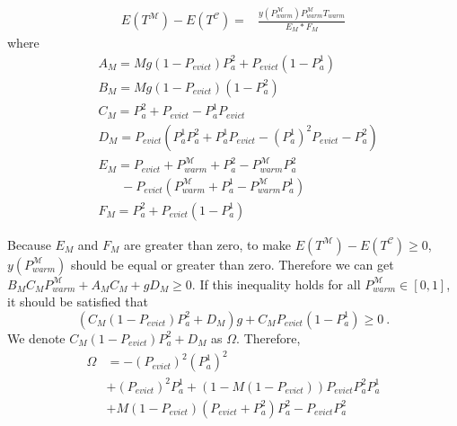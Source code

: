 \begin{equation}
\label{equ:detail2}
\begin{split}
E(T^{\mathcal{M}}) - E(T^{\mathcal{C}}) = &\frac{y(P_{warm}^{\mathcal{M}})P_{warm}^{\mathcal{M}}T_{warm}}{E_{M}*F_{M}}
\end{split}\end{equation}
where
\begin{equation*}
\begin{split}
&A_{M}= Mg(1-P_{evict})P_{a}^{\mathfrak{2}}+P_{evict}(1-P_{a}^{\mathfrak{1}})\\
&B_{M}=Mg(1-P_{evict})(1-P_{a}^{\mathfrak{2}})\\
&C_{M}=P_{a}^{\mathfrak{2}}+P_{evict}-P_{a}^{\mathfrak{1}}P_{evict}\\
&D_{M}=P_{evict}(P_{a}^{\mathfrak{1}}P_{a}^{\mathfrak{2}}+P_{a}^{\mathfrak{1}}P_{evict}-(P_{a}^{\mathfrak{1}})^2P_{evict}-P_{a}^{\mathfrak{2}})\\
&E_{M}=P_{evict}+P_{warm}^{\mathcal{M}}+P_{a}^{\mathfrak{2}}-P_{warm}^{\mathcal{M}}P_{a}^{\mathfrak{2}} \\& \ \ \ \ \ \ \ \ -P_{evict}(P_{warm}^{\mathcal{M}}+P_{a}^{\mathfrak{1}}-P_{warm}^{\mathcal{M}}P_{a}^{\mathfrak{1}})\\
&F_{M}=P_{a}^{\mathfrak{2}}+P_{evict}(1-P_{a}^{\mathfrak{1}})
\end{split}\end{equation*}

Because $E_{M}$ and $F_{M}$ are greater than zero, to make $E(T^{\mathcal{M}}) - E(T^{\mathcal{C}}) \geq 0$, $y(P_{warm}^{\mathcal{M}})$ should be equal or greater than zero.
Therefore we can get $ B_{M}C_{M}P_{warm}^{\mathcal{M}}+A_{M}C_{M}+gD_{M} \geq 0$.
If this inequality holds for all $P_{warm}^{\mathcal{M}} \in [0,1]$, it should be satisfied that
\begin{equation}\label{equ:omega}
  (C_{M}(1-P_{evict})P_{a}^{\mathfrak{2}}+D_{M})g+C_{M}P_{evict}(1-P_{a}^{\mathfrak{1}}) \geq 0 \ .
\end{equation}
We denote $C_{M}(1-P_{evict})P_{a}^{\mathfrak{2}}+D_{M}$ as $\Omega$.
Therefore,
\begin{equation}
\begin{split}
\Omega &=-(P_{evict})^2(P_{a}^{\mathfrak{1}})^2  \\
&+(P_{evict})^2P_{a}^{\mathfrak{1}}+(1-M(1-P_{evict}))P_{evict}P_{a}^{\mathfrak{2}}P_{a}^{\mathfrak{1}}\\
&+M(1-P_{evict})(P_{evict}+P_{a}^{\mathfrak{2}})P_{a}^{\mathfrak{2}}-P_{evict}P_{a}^{\mathfrak{2}}
\end{split}\end{equation}

